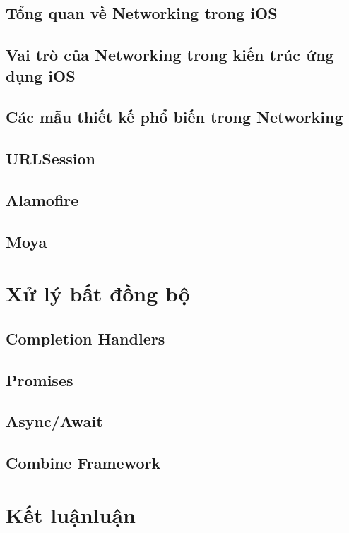     \subsection{Tổng quan về Networking trong iOS}
    \subsection{Vai trò của Networking trong kiến trúc ứng dụng iOS}
    \subsection{Các mẫu thiết kế phổ biến trong Networking}
    \subsection{URLSession}
    \subsection{Alamofire}
    \subsection{Moya}
\section{Xử lý bất đồng bộ}
    \subsection{Completion Handlers}
    \subsection{Promises}
    \subsection{Async/Await}
    \subsection{Combine Framework}
\section{Kết luậnluận}
